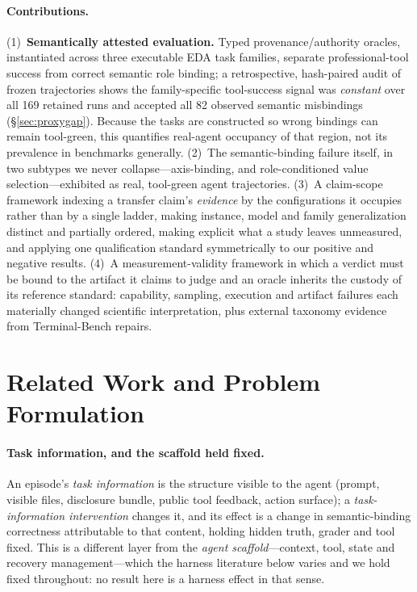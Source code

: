 \documentclass{article}
\begin{document}
\paragraph{Contributions.} (1)~\textbf{Semantically attested evaluation.} Typed provenance/authority oracles, instantiated across three executable EDA task families, separate professional-tool success from correct semantic role binding; a retrospective, hash-paired audit of frozen trajectories shows the family-specific tool-success signal was \emph{constant} over all 169 retained runs and accepted all 82 observed semantic misbindings (\S\ref{sec:proxygap}). Because the tasks are constructed so wrong bindings can remain tool-green, this quantifies real-agent occupancy of that region, not its prevalence in benchmarks generally. (2)~The semantic-binding failure itself, in two subtypes we never collapse---axis-binding, and role-conditioned value selection---exhibited as real, tool-green agent trajectories. (3)~A claim-scope framework indexing a transfer claim's \emph{evidence} by the configurations it occupies rather than by a single ladder, making instance, model and family generalization distinct and partially ordered, making explicit what a study leaves unmeasured, and applying one qualification standard symmetrically to our positive and negative results. (4)~A measurement-validity framework in which a verdict must be bound to the artifact it claims to judge and an oracle inherits the custody of its reference standard: capability, sampling, execution and artifact failures each materially changed scientific interpretation, plus external taxonomy evidence from Terminal-Bench repairs.

\section{Related Work and Problem Formulation}
\label{sec:related}
\paragraph{Task information, and the scaffold held fixed.} An episode's \emph{task information} is the structure visible to the agent (prompt, visible files, disclosure bundle, public tool feedback, action surface); a \emph{task-information intervention} changes it, and its effect is a change in semantic-binding correctness attributable to that content, holding hidden truth, grader and tool fixed. This is a different layer from the \emph{agent scaffold}---context, tool, state and recovery management---which the harness literature below varies and we hold fixed throughout: no result here is a harness effect in that sense.
\end{document}
